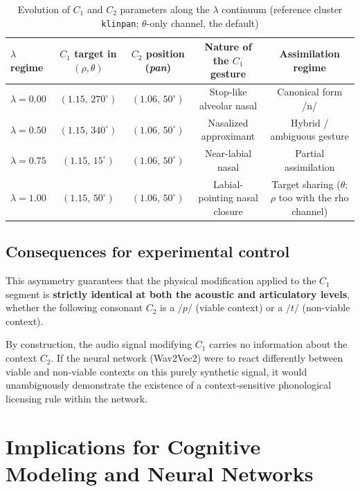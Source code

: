\documentclass[11pt,a4paper]{article}
\begin{document}
\begin{table}[h]
\centering
\caption{Evolution of $C_1$ and $C_2$ parameters along the $\lambda$ continuum (reference cluster \texttt{klinpan}; $\theta$-only channel, the default)}
\vspace{0.2cm}
\small
\begin{tabular}{lcccc}
\toprule
\textbf{$\lambda$ regime} & \textbf{$C_1$ target in $(\rho, \theta)$} & \textbf{$C_2$ position (\textit{pan})} & \textbf{Nature of the $C_1$ gesture} & \textbf{Assimilation regime} \\
\midrule
$\lambda = 0.00$ & $(1.15,\, 270^\circ)$ & $(1.06,\, 50^\circ)$ & Stop-like alveolar nasal & Canonical form /n/ \\
$\lambda = 0.50$ & $(1.15,\, 340^\circ)$ & $(1.06,\, 50^\circ)$ & Nasalized approximant & Hybrid / ambiguous gesture \\
$\lambda = 0.75$ & $(1.15,\, 15^\circ)$ & $(1.06,\, 50^\circ)$ & Near-labial nasal & Partial assimilation \\
$\lambda = 1.00$ & $(1.15,\, 50^\circ)$ & $(1.06,\, 50^\circ)$ & Labial-pointing nasal closure & Target sharing ($\theta$; $\rho$ too with the rho channel) \\
\bottomrule
\end{tabular}
\end{table}

\subsection{Consequences for experimental control}
This asymmetry guarantees that the physical modification applied to the $C_1$ segment is \textbf{strictly identical at both the acoustic and articulatory levels}, whether the following consonant $C_2$ is a $/p/$ (viable context) or a $/t/$ (non-viable context).

\begin{keyinsight}
By construction, the audio signal modifying $C_1$ carries no information about the context $C_2$. If the neural network (Wav2Vec2) were to react differently between viable and non-viable contexts on this purely synthetic signal, it would unambiguously demonstrate the existence of a context-sensitive phonological licensing rule within the network.
\end{keyinsight}

\section{Implications for Cognitive Modeling and Neural Networks}
\end{document}
